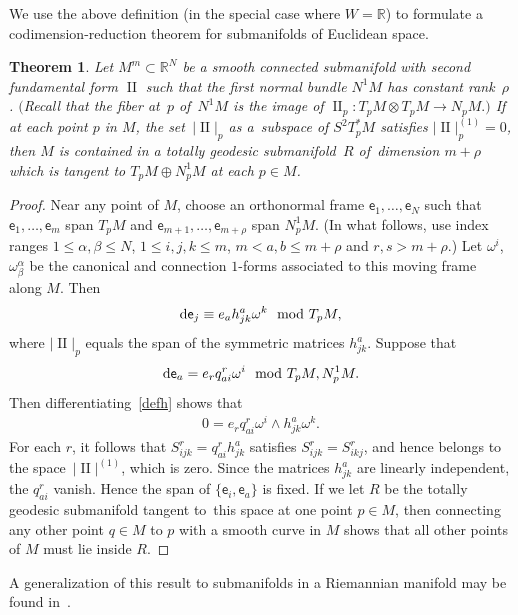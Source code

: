 \documentclass[10pt,a4paper]{amsart}
\def\R{\mathbb{R}}
\def\ve{\mathsf{e}}
\def\II{\operatorname{II}} %
\newtheorem{Theorem}{Theorem}[section]
\numberwithin{equation}{section}
\begin{document}
We use the above definition (in the special case where $W=\R$) to formulate a codimension-reduction theorem for submanifolds of Euclidean space.

\begin{Theorem} \label{codim-reduction-thm}
Let $M^m \subset \R^N$ be a smooth connected submanifold with second fundamental form $\II$ such that the first normal bundle $N^1 M$ has constant rank~$\rho$. $($Recall that the fiber at~$p$ of~$N^1 M$ is the image of $\II_p\colon T_p M \otimes T_p M \to N_p M.)$ If at each point $p$ in $M$, the set~$|\II|_p$ as a~subspace of $S^2 T_p^* M$ satisfies $|\II|_p^{(1)}=0$, then $M$ is contained in a totally geodesic submanifold~$R$ of~dimension $m+\rho$ which is tangent to $T_p M \oplus N^1_p M$ at each $p \in M$.
\end{Theorem}
\begin{proof}
Near any point of $M$, choose an orthonormal frame $\ve_1, \dots, \ve_N$ such that $\ve_1, \dots, \ve_m$ span $T_p M$ and $\ve_{m+1}, \dots, \ve_{m+\rho}$ span $N^1_p M$. (In what follows, use index ranges $1 \le \alpha, \beta \le N$, $1\le i,j,k \le m$, $m< a,b \le m+\rho$ and $r,s > m+\rho$.) Let $\omega^i$, $\omega^\alpha_\beta$ be the canonical and connection $1$-forms associated to this moving frame along $M$. Then
\begin{gather} \label{defh}
{\rm d}\ve_j \equiv e_a h^a_{jk} \omega^k \mod T_p M,
\end{gather}
where $|\II|_p$ equals the span of the symmetric matrices $h^a_{jk}$. Suppose that
\begin{gather*}
{\rm d}\ve_a = e_r q^r_{ai} \omega^i	\mod T_pM, N^1_p M.
\end{gather*}
Then differentiating~\eqref{defh} shows that
\begin{gather*}
0 = e_r q^r_{ai} \omega^i \wedge h^a_{jk} \omega^k.
\end{gather*}
For each $r$, it follows that $S^r_{ijk} = q^r_{ai} h^a_{jk}$ satisfies $S^r_{ijk} = S^r_{ikj}$, and hence belongs to the space~$|\II|^{(1)}$, which is zero. Since the matrices $h^a_{jk}$ are linearly independent, the $q^r_{ai}$ vanish. Hence the span of $\{ \ve_i, \ve_a\}$ is fixed. If we let $R$ be the totally geodesic submanifold tangent to~this space at one point $p \in M$, then connecting any other point $q\in M$ to $p$ with a smooth curve in $M$ shows that all other points of $M$ must lie inside $R$.
\end{proof}

A generalization of this result to submanifolds in a Riemannian manifold may be found in~\cite[Section~4.2]{BY}.
\end{document}
